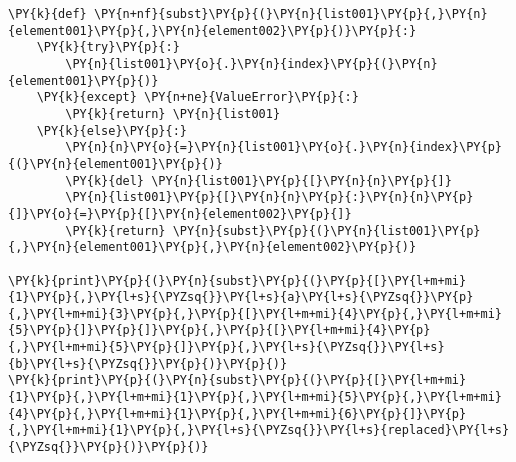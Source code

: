 \begin{Verbatim}[commandchars=\\\{\}]
\PY{k}{def} \PY{n+nf}{subst}\PY{p}{(}\PY{n}{list001}\PY{p}{,}\PY{n}{element001}\PY{p}{,}\PY{n}{element002}\PY{p}{)}\PY{p}{:}
    \PY{k}{try}\PY{p}{:}
        \PY{n}{list001}\PY{o}{.}\PY{n}{index}\PY{p}{(}\PY{n}{element001}\PY{p}{)}
    \PY{k}{except} \PY{n+ne}{ValueError}\PY{p}{:}
        \PY{k}{return} \PY{n}{list001}
    \PY{k}{else}\PY{p}{:}
        \PY{n}{n}\PY{o}{=}\PY{n}{list001}\PY{o}{.}\PY{n}{index}\PY{p}{(}\PY{n}{element001}\PY{p}{)}
        \PY{k}{del} \PY{n}{list001}\PY{p}{[}\PY{n}{n}\PY{p}{]}
        \PY{n}{list001}\PY{p}{[}\PY{n}{n}\PY{p}{:}\PY{n}{n}\PY{p}{]}\PY{o}{=}\PY{p}{[}\PY{n}{element002}\PY{p}{]}
        \PY{k}{return} \PY{n}{subst}\PY{p}{(}\PY{n}{list001}\PY{p}{,}\PY{n}{element001}\PY{p}{,}\PY{n}{element002}\PY{p}{)}

\PY{k}{print}\PY{p}{(}\PY{n}{subst}\PY{p}{(}\PY{p}{[}\PY{l+m+mi}{1}\PY{p}{,}\PY{l+s}{\PYZsq{}}\PY{l+s}{a}\PY{l+s}{\PYZsq{}}\PY{p}{,}\PY{l+m+mi}{3}\PY{p}{,}\PY{p}{[}\PY{l+m+mi}{4}\PY{p}{,}\PY{l+m+mi}{5}\PY{p}{]}\PY{p}{]}\PY{p}{,}\PY{p}{[}\PY{l+m+mi}{4}\PY{p}{,}\PY{l+m+mi}{5}\PY{p}{]}\PY{p}{,}\PY{l+s}{\PYZsq{}}\PY{l+s}{b}\PY{l+s}{\PYZsq{}}\PY{p}{)}\PY{p}{)}
\PY{k}{print}\PY{p}{(}\PY{n}{subst}\PY{p}{(}\PY{p}{[}\PY{l+m+mi}{1}\PY{p}{,}\PY{l+m+mi}{1}\PY{p}{,}\PY{l+m+mi}{5}\PY{p}{,}\PY{l+m+mi}{4}\PY{p}{,}\PY{l+m+mi}{1}\PY{p}{,}\PY{l+m+mi}{6}\PY{p}{]}\PY{p}{,}\PY{l+m+mi}{1}\PY{p}{,}\PY{l+s}{\PYZsq{}}\PY{l+s}{replaced}\PY{l+s}{\PYZsq{}}\PY{p}{)}\PY{p}{)}
\end{Verbatim}
